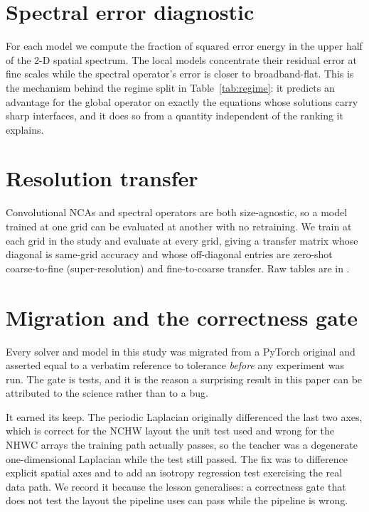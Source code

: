 \section{Spectral error diagnostic}\label{app:spectral}

For each model we compute the fraction of squared error energy in the upper half of the
2-D spatial spectrum. The local models concentrate their residual error at fine scales
while the spectral operator's error is closer to broadband-flat. This is the mechanism
behind the regime split in Table~\ref{tab:regime}: it predicts an advantage for the global
operator on exactly the equations whose solutions carry sharp interfaces, and it does so
from a quantity independent of the ranking it explains.

\section{Resolution transfer}\label{app:resolution}

Convolutional NCAs and spectral operators are both size-agnostic, so a model trained at one
grid can be evaluated at another with no retraining. We train at each grid in the study and
evaluate at every grid, giving a transfer matrix whose diagonal is same-grid accuracy and
whose off-diagonal entries are zero-shot coarse-to-fine (super-resolution) and
fine-to-coarse transfer. Raw tables are in .

\section{Migration and the correctness gate}\label{app:migration}

Every solver and model in this study was migrated from a PyTorch original and asserted
equal to a verbatim reference to tolerance \emph{before} any experiment was run. The gate
is \Ntests{} tests, and it is the reason a surprising result in this paper can be
attributed to the science rather than to a bug.

It earned its keep. The periodic Laplacian originally differenced the last two axes, which
is correct for the NCHW layout the unit test used and wrong for the NHWC arrays the
training path actually passes, so the teacher was a degenerate one-dimensional Laplacian
while the test still passed. The fix was to difference explicit spatial axes and to add an
isotropy regression test exercising the real data path. We record it because the lesson
generalises: a correctness gate that does not test the layout the pipeline uses can pass
while the pipeline is wrong.

